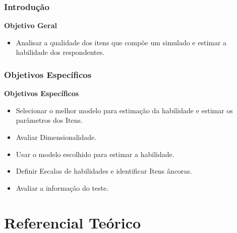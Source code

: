 \documentclass{beamer}
\begin{document}
	
	\begin{frame}
		\frametitle{Introdução}
		\begin{center}
		\textbf{Objetivo Geral}	
		\end{center}
		
		\begin{itemize}
			\item<1-> Analisar a qualidade dos itens que compõe um simulado e 
			estimar a habilidade dos respondentes.
		\end{itemize}
	\end{frame}
	\begin{frame}
		\frametitle{Objetivos Específicos}
		\begin{center}
			\textbf{Objetivos Específicos}	
		\end{center}
		
		\begin{itemize}
			\item<1-> Selecionar o melhor modelo para estimação da habilidade e estimar os parâmetros dos Itens.
			\item<2-> Avaliar Dimensionalidade.
			\item<3-> Usar o modelo escolhido para estimar a habilidade.
			\item<4-> Definir Escalas de habilidades e identificar Itens âncoras.
			\item<5-> Avaliar a informação do teste.
		\end{itemize}
	\end{frame}
	
	
	\section{Referencial Teórico}
	
\end{document}
